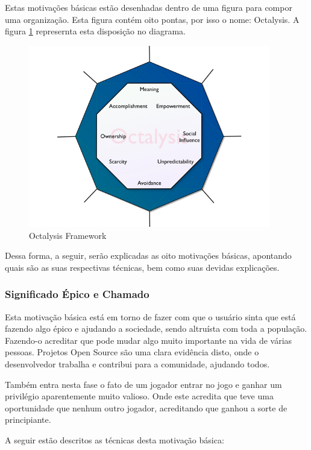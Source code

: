 Estas motivações básicas estão desenhadas dentro de uma figura para
compor uma organização. Esta figura contém oito pontas, por isso o nome:
Octalysis. A figura \ref{fig:octalysisframework} represernta esta
disposição no diagrama.

\begin{figure}[h]
    \centering
    \includegraphics[width=400px, scale=1]{figuras/octalysisframework}
    \caption{Octalysis Framework}
    \label{fig:octalysisframework}
\end{figure}

Dessa forma, a seguir, serão explicadas as oito motivações básicas,
apontando quais são as suas respectivas técnicas, bem como
suas devidas explicações.

\subsubsection{Significado Épico e Chamado}
\label{sub:significadoepico}
Esta motivação básica está em torno de fazer com que o usuário sinta que
está fazendo algo épico e ajudando a sociedade, sendo altruísta com toda
a população. Fazendo-o acreditar que pode mudar algo muito importante
na vida de várias pessoas. Projetos Open Source são uma clara evidência
disto, onde o desenvolvedor trabalha e contribui para a comunidade, ajudando
todos.

Também entra nesta fase o fato de um jogador entrar no jogo e ganhar um
privilégio aparentemente muito valioso. Onde este acredita que teve uma
oportunidade que nenhum outro jogador, acreditando que ganhou a sorte de
principiante.

A seguir estão descritos as técnicas desta motivação básica:

